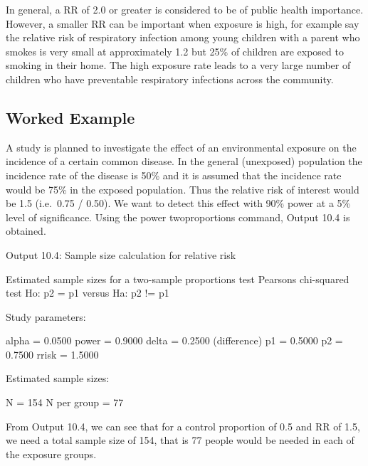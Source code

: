 \documentclass[
]{memoir}
\newenvironment{Shaded}{\begin{snugshade}}{\end{snugshade}}
\newcommand{\NormalTok}[1]{#1}
\begin{document}
In general, a RR of 2.0 or greater is considered to be of public health importance. However, a smaller RR can be important when exposure is high, for example say the relative risk of respiratory infection among young children with a parent who smokes is very small at approximately 1.2 but 25\% of children are exposed to smoking in their home. The high exposure rate leads to a very large number of children who have preventable respiratory infections across the community.

\hypertarget{worked-example-10}{%
\subsection{Worked Example}\label{worked-example-10}}

A study is planned to investigate the effect of an environmental exposure on the incidence of a certain common disease. In the general (unexposed) population the incidence rate of the disease is 50\% and it is assumed that the incidence rate would be 75\% in the exposed population. Thus the relative risk of interest would be 1.5 (i.e.~0.75 / 0.50). We want to detect this effect with 90\% power at a 5\% level of significance. Using the power twoproportions command, Output 10.4 is obtained.

Output 10.4: Sample size calculation for relative risk

\begin{Shaded}
\begin{Highlighting}[]
\NormalTok{Estimated sample sizes for a two{-}sample proportions test}
\NormalTok{Pearson\textquotesingle{}s chi{-}squared test }
\NormalTok{Ho: p2 = p1  versus  Ha: p2 != p1}

\NormalTok{Study parameters:}

\NormalTok{        alpha =    0.0500}
\NormalTok{        power =    0.9000}
\NormalTok{        delta =    0.2500  (difference)}
\NormalTok{           p1 =    0.5000}
\NormalTok{           p2 =    0.7500}
\NormalTok{        rrisk =    1.5000}

\NormalTok{Estimated sample sizes:}

\NormalTok{            N =       154}
\NormalTok{  N per group =        77}
\end{Highlighting}
\end{Shaded}

From Output 10.4, we can see that for a control proportion of 0.5 and RR of 1.5, we need a total sample size of 154, that is 77 people would be needed in each of the exposure groups.
\end{document}
